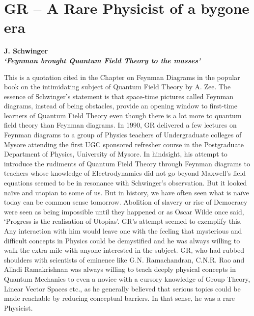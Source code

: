 \chapter{GR – A Rare Physicist of a bygone era}\label{chap8}


\begin{center}
\textbf{J. Schwinger}\\
\textbf{\textit{‘Feynman brought Quantum Field Theory to the masses’}}
\end{center}

This is a quotation cited in the Chapter on Feynman Diagrams in the popular book on the intimidating subject of Quantum Field Theory by A. Zee. The essence of Schwinger's statement is that space-time pictures called Feynman diagrams, instead of being obstacles, provide an opening window to first-time learners of Quantum Field Theory even though there is a lot more to quantum field theory than Feynman diagrams. In 1990, GR delivered a few lectures on Feynman diagrams to a group of Physics teachers of Undergraduate colleges of Mysore attending the first UGC sponsored refresher course in the Postgraduate Department of Physics, University of Mysore. In hindsight, his attempt to introduce the rudiments of Quantum Field Theory through Feynman diagrams to teachers whose knowledge of Electrodynamics did not go beyond Maxwell's field equations seemed to be in resonance with Schwinger's observation. But it looked naïve and utopian to some of us. But in history, we have often seen what is na\"{i}ve today can be common sense tomorrow. Abolition of slavery or rise of Democracy were seen as being impossible until they happened or as Oscar Wilde once said, `Progress is the realisation of Utopias'. GR's attempt seemed to exemplify this. Any interaction with him would leave one with the feeling that mysterious and difficult concepts in Physics could be demystified and he was always willing to walk the extra mile with anyone interested in the subject. GR, who had rubbed shoulders with scientists of eminence like G.N. Ramachandran, C.N.R. Rao and Alladi Ramakrishnan was always willing to teach deeply physical concepts in Quantum Mechanics to even a novice with a cursory knowledge of Group Theory,  Linear Vector Spaces etc., as he generally believed that serious topics could be made reachable by reducing conceptual barriers. In that sense, he was a rare Physicist.

